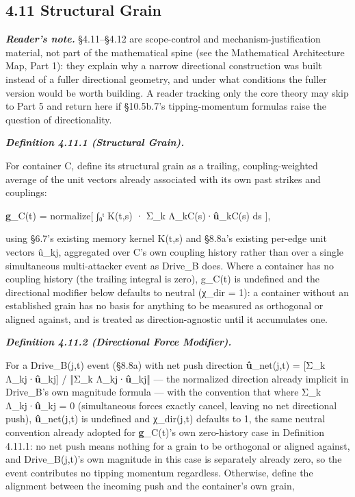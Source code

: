 \documentclass[
]{article}
\begin{document}
\hypertarget{structural-grain}{%
\subsection{4.11 Structural Grain}\label{structural-grain}}

\emph{\textbf{Reader's note.}} §4.11--§4.12 are scope-control and
mechanism-justification material, not part of the mathematical spine
(see the Mathematical Architecture Map, Part 1): they explain why a
narrow directional construction was built instead of a fuller
directional geometry, and under what conditions the fuller version would
be worth building. A reader tracking only the core theory may skip to
Part 5 and return here if §10.5b.7's tipping-momentum formulas raise the
question of directionality.

\emph{\textbf{Definition 4.11.1 (Structural Grain).}}

For container C, define its structural grain as a trailing,
coupling-weighted average of the unit vectors already associated with
its own past strikes and couplings:

\textbf{g}\_C(t) = normalize{[} ∫₀ᵗ K(t,s) · Σ\_k
Λ\_kC(s)·\textbf{û}\_kC(s) ds {]},

using §6.7's existing memory kernel K(t,s) and §8.8a's existing per-edge
unit vectors û\_kj, aggregated over C's own coupling history rather than
over a single simultaneous multi-attacker event as Drive\_B does. Where
a container has no coupling history (the trailing integral is zero),
g\_C(t) is undefined and the directional modifier below defaults to
neutral (χ\_dir = 1): a container without an established grain has no
basis for anything to be measured as orthogonal or aligned against, and
is treated as direction-agnostic until it accumulates one.

\emph{\textbf{Definition 4.11.2 (Directional Force Modifier).}}

For a Drive\_B(j,t) event (§8.8a) with net push direction
\textbf{û}\_net(j,t) = {[}Σ\_k Λ\_kj·\textbf{û}\_kj{]} / ‖Σ\_k
Λ\_kj·\textbf{û}\_kj‖ --- the normalized direction already implicit in
Drive\_B's own magnitude formula --- with the convention that where Σ\_k
Λ\_kj·\textbf{û}\_kj = 0 (simultaneous forces exactly cancel, leaving no
net directional push), \textbf{û}\_net(j,t) is undefined and χ\_dir(j,t)
defaults to 1, the same neutral convention already adopted for
\textbf{g}\_C(t)'s own zero-history case in Definition 4.11.1: no net
push means nothing for a grain to be orthogonal or aligned against, and
Drive\_B(j,t)'s own magnitude in this case is separately already zero,
so the event contributes no tipping momentum regardless. Otherwise,
define the alignment between the incoming push and the container's own
grain,
\end{document}
